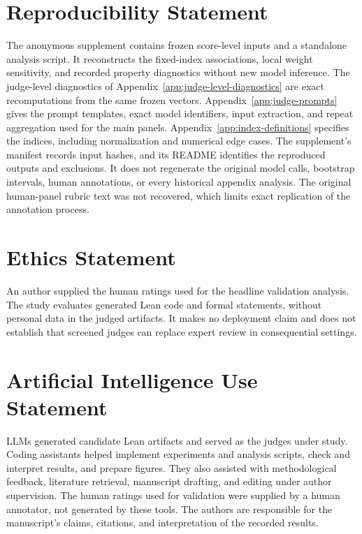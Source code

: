 \clearpage
\section*{Reproducibility Statement}
The anonymous supplement contains frozen score-level inputs and a standalone analysis script.
It reconstructs the fixed-index associations, local weight sensitivity, and recorded property diagnostics without new model inference.
The judge-level diagnostics of Appendix~\ref{app:judge-level-diagnostics} are exact recomputations from the same frozen vectors.
Appendix~\ref{app:judge-prompts} gives the prompt templates, exact model identifiers, input extraction, and repeat aggregation used for the main panels.
Appendix~\ref{app:index-definitions} specifies the indices, including normalization and numerical edge cases.
The supplement's manifest records input hashes, and its README identifies the reproduced outputs and exclusions.
It does not regenerate the original model calls, bootstrap intervals, human annotations, or every historical appendix analysis.
The original human-panel rubric text was not recovered, which limits exact replication of the annotation process.

\section*{Ethics Statement}
An author supplied the human ratings used for the headline validation analysis.
The study evaluates generated Lean code and formal statements, without personal data in the judged artifacts.
It makes no deployment claim and does not establish that screened judges can replace expert review in consequential settings.

\section*{Artificial Intelligence Use Statement}
LLMs generated candidate Lean artifacts and served as the judges under study.
Coding assistants helped implement experiments and analysis scripts, check and interpret results, and prepare figures.
They also assisted with methodological feedback, literature retrieval, manuscript drafting, and editing under author supervision.
The human ratings used for validation were supplied by a human annotator, not generated by these tools.
The authors are responsible for the manuscript's claims, citations, and interpretation of the recorded results.

